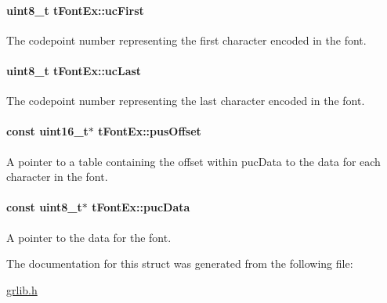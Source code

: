 \paragraph[{uc\+First}]{\setlength{\rightskip}{0pt plus 5cm}uint8\+\_\+t t\+Font\+Ex\+::uc\+First}\label{structt_font_ex_a1713d8f3dda1b6da85b7d35dbc6df056}
The codepoint number representing the first character encoded in the font. 
\paragraph[{uc\+Last}]{\setlength{\rightskip}{0pt plus 5cm}uint8\+\_\+t t\+Font\+Ex\+::uc\+Last}\label{structt_font_ex_a255cd79c42ea16526ec00d19a0cc0b18}
The codepoint number representing the last character encoded in the font. 
\paragraph[{pus\+Offset}]{\setlength{\rightskip}{0pt plus 5cm}const uint16\+\_\+t$\ast$ t\+Font\+Ex\+::pus\+Offset}\label{structt_font_ex_aaab3266bca56077196a0f8025be5f7d4}
A pointer to a table containing the offset within puc\+Data to the data for each character in the font. 
\paragraph[{puc\+Data}]{\setlength{\rightskip}{0pt plus 5cm}const uint8\+\_\+t$\ast$ t\+Font\+Ex\+::puc\+Data}\label{structt_font_ex_a3c7bf575dfbc6a76bacfd57baa618b4f}


A pointer to the data for the font. 



The documentation for this struct was generated from the following file\+:\begin{DoxyCompactItemize}
\item 
\hyperlink{grlib_8h}{grlib.\+h}\end{DoxyCompactItemize}
